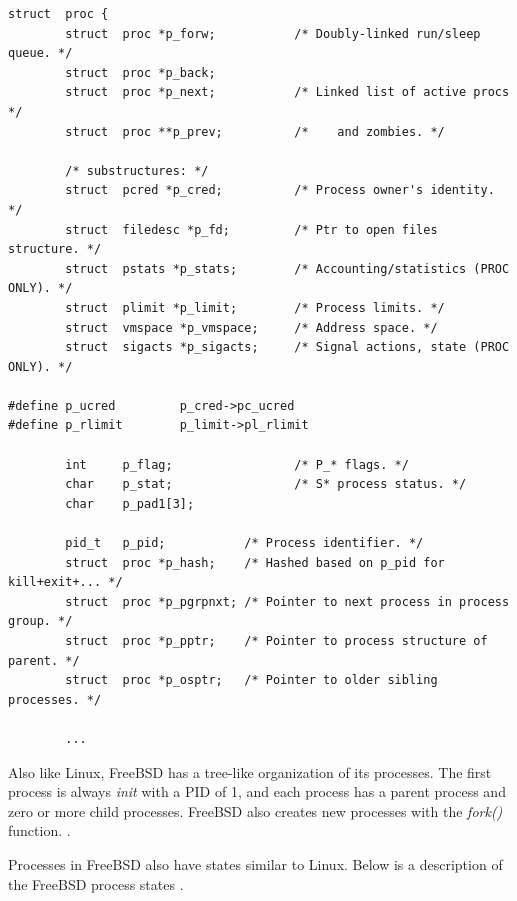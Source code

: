 \documentclass[10pt,draftclsnofoot,onecolumn,journal,compsoc]{IEEEtran}
\begin{document}
\begin{lstlisting}[caption={Excerpt from \textit{proc} structure}]
struct  proc {
        struct  proc *p_forw;           /* Doubly-linked run/sleep queue. */
        struct  proc *p_back;
        struct  proc *p_next;           /* Linked list of active procs */
        struct  proc **p_prev;          /*    and zombies. */

        /* substructures: */
        struct  pcred *p_cred;          /* Process owner's identity. */
        struct  filedesc *p_fd;         /* Ptr to open files structure. */
        struct  pstats *p_stats;        /* Accounting/statistics (PROC ONLY). */
        struct  plimit *p_limit;        /* Process limits. */
        struct  vmspace *p_vmspace;     /* Address space. */
        struct  sigacts *p_sigacts;     /* Signal actions, state (PROC ONLY). */

#define p_ucred         p_cred->pc_ucred
#define p_rlimit        p_limit->pl_rlimit

        int     p_flag;                 /* P_* flags. */
        char    p_stat;                 /* S* process status. */
        char    p_pad1[3];

        pid_t   p_pid;           /* Process identifier. */
        struct  proc *p_hash;    /* Hashed based on p_pid for kill+exit+... */
        struct  proc *p_pgrpnxt; /* Pointer to next process in process group. */
        struct  proc *p_pptr;    /* Pointer to process structure of parent. */
        struct  proc *p_osptr;   /* Pointer to older sibling processes. */
        
        ...

\end{lstlisting}

Also like Linux, FreeBSD has a tree-like organization of its processes. The first process is always \textit{init} with a PID of 1, and each process has a parent process and zero or more child processes. FreeBSD also creates new processes with the \textit{fork()} function. \cite{bsd_proc3}.

Processes in FreeBSD also have states similar to Linux. Below is a description of the FreeBSD process states \cite{bsd_proc}.\\ \\
\end{document}
